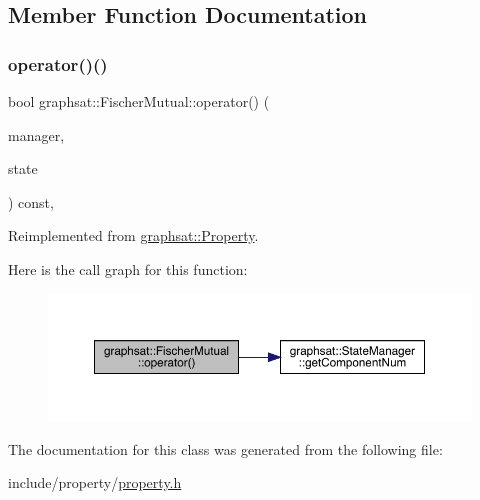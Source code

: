 \subsection{Member Function Documentation}
\mbox{\label{classgraphsat_1_1_fischer_mutual_a11572dd4ab57bd628b3424f5aa2b9b47}} 
\subsubsection{\texorpdfstring{operator()()}{operator()()}}
{\footnotesize\ttfamily bool graphsat\+::\+Fischer\+Mutual\+::operator() (\begin{DoxyParamCaption}\item[{const \mbox{\hyperlink{classgraphsat_1_1_state_manager}{State\+Manager}}$<$ int $>$ \&}]{manager,  }\item[{const int $\ast$const}]{state }\end{DoxyParamCaption}) const\hspace{0.3cm}{\ttfamily [inline]}, {\ttfamily [virtual]}}



Reimplemented from \mbox{\hyperlink{classgraphsat_1_1_property_a28a98381d3a2d2a7a67766d0ef90b30a}{graphsat\+::\+Property}}.

Here is the call graph for this function\+:\nopagebreak
\begin{figure}[H]
\begin{center}
\leavevmode
\includegraphics[width=350pt]{classgraphsat_1_1_fischer_mutual_a11572dd4ab57bd628b3424f5aa2b9b47_cgraph}
\end{center}
\end{figure}


The documentation for this class was generated from the following file\+:\begin{DoxyCompactItemize}
\item 
include/property/\mbox{\hyperlink{property_8h}{property.\+h}}\end{DoxyCompactItemize}
